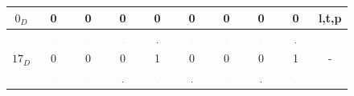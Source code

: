 \documentclass[10pt,a4paper,boxed]{hmcpset}
\begin{document}
\begin{table}[h!]
\begin{tabular}{|c|c|c|c|c|c|c|c|c|c|}
	      $0_D$ & 0 & 0 & 0 & 0 & 0 & 0 & 0 & 0 & l,t,p \\ 
		\hline  & \includegraphics[width=0.03\textwidth]{img/0.pdf} & \includegraphics[width=0.03\textwidth]{img/0.pdf} & \includegraphics[width=0.03\textwidth]{img/0.pdf} & \includegraphics[width=0.03\textwidth]{img/1.pdf} & \includegraphics[width=0.03\textwidth]{img/0.pdf} & \includegraphics[width=0.03\textwidth]{img/0.pdf} & \includegraphics[width=0.03\textwidth]{img/0.pdf} & \includegraphics[width=0.03\textwidth]{img/1.pdf} &  \\ 
		 $17_D$ & 0 & 0 & 0 & 1 & 0 & 0 & 0 & 1 & - \\  
		\hline  & \includegraphics[width=0.03\textwidth]{img/0.pdf} & \includegraphics[width=0.03\textwidth]{img/0.pdf} & \includegraphics[width=0.03\textwidth]{img/1.pdf} & \includegraphics[width=0.03\textwidth]{img/0.pdf} & \includegraphics[width=0.03\textwidth]{img/1.pdf} & \includegraphics[width=0.03\textwidth]{img/0.pdf} & \includegraphics[width=0.03\textwidth]{img/1.pdf} & \includegraphics[width=0.03\textwidth]{img/0.pdf} &  \\ 

\end{tabular}
\end{table}
\end{document}

